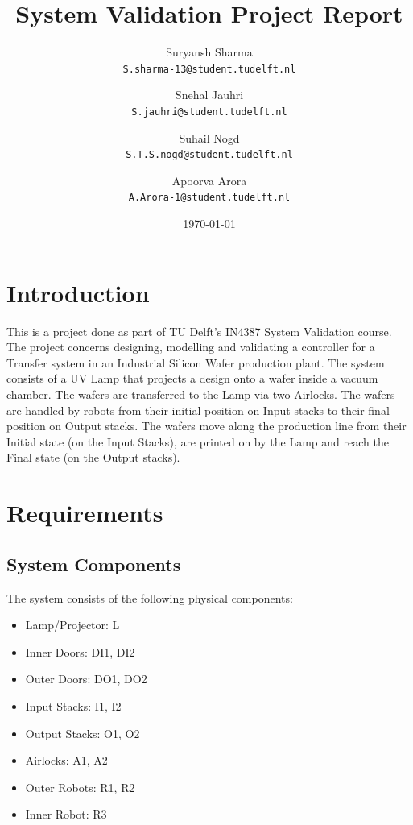 \documentclass[a4paper,12pt]{article}
\begin{document}
\title{System Validation Project Report}
\author{
	Suryansh Sharma \\ 
	\texttt{S.sharma-13@student.tudelft.nl}
 	\and 
	Snehal Jauhri \\
	\texttt{S.jauhri@student.tudelft.nl} 
	\and
	Suhail Nogd \\
	\texttt{S.T.S.nogd@student.tudelft.nl} 	
	 \and 
	Apoorva Arora\\
	\texttt{A.Arora-1@student.tudelft.nl} 
}

\date {\today}
\maketitle

\section{Introduction}
This is a project done as part of TU Delft's IN4387 System Validation course. The project concerns designing, modelling and validating a controller for a Transfer system in an Industrial Silicon Wafer production plant.
The system consists of a UV Lamp that projects a design onto a wafer inside a vacuum chamber. The wafers are transferred to the Lamp via two Airlocks. The wafers are handled by robots from their initial position on Input stacks to their final position on Output stacks. The wafers move along the production line from their Initial state (on the Input Stacks), are printed on by the Lamp and reach the Final state (on the Output stacks).

\section{Requirements}

\subsection{System Components}
The system consists of the following physical components:
\begin{itemize}
\item Lamp/Projector: L
\item Inner Doors: DI1, DI2
\item Outer Doors: DO1, DO2
\item Input Stacks: I1, I2
\item Output Stacks: O1, O2
\item Airlocks: A1, A2
\item Outer Robots: R1, R2
\item Inner Robot: R3
\end{itemize}
\end{document}
